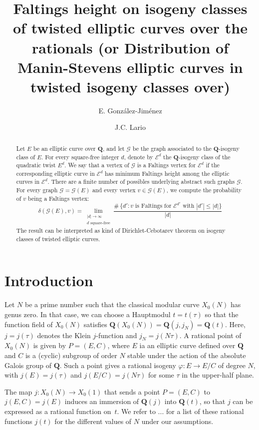 \documentclass[
  journal=small,
  manuscript=article-type,  %
  year=2020,
  volume=37,
]{cup-journal}
\title{Faltings height on isogeny classes of twisted elliptic curves over the rationals (or Distribution of Manin-Stevens elliptic curves in twisted isogeny classes over)}
\author{E. González-Jiménez}
\affiliation{UAM}
\author{J.C. Lario}
\affiliation{UPC}
\begin{document}
\begin{abstract}
Let $E$ be an elliptic curve over $\mathbf{Q}$, and let $\mathcal{G}$ be the graph associated to the $\mathbf{Q}$-isogeny class of $E$.  
For every square-free integer $d$, denote by $\mathcal{E}^d$ the $\mathbf{Q}$-isogeny class of the quadratic twist $E^d$.
We say that a vertex of $\mathcal{G}$ is a Faltings vertex for $\mathcal{E}^d$ if the corresponding elliptic curve in  $\mathcal{E}^d$ has minimum Faltings height among the elliptic curves in 
$\mathcal{E}^d$. There are a finite number of possibles underlying abstract such graphs $\mathcal{G}$. For every graph $\mathcal{G}=\mathcal{G}(E)$ and every vertex $v\in \mathcal{G}(E)$, we compute the probability of $v$ being a Faltings vertex:
$$
\delta(\mathcal{G}(E),v) = \lim_{\substack{
|d|\to \infty \\ d \text{ square-free} }}
\frac{
\# \, \{ d'\colon 
v \text{ is  Faltings for } \mathcal{E}^{d'} 
\text{ with }
|d'|
\leq  |d| \} }{|d|} 
$$
The result can be interpreted as kind of Dirichlet-Cebotarev theorem on isogeny classes of twisted elliptic curves.  
\end{abstract}



\section{Introduction} 
Let $N$ be a prime number such that the classical modular curve $X_0(N)$ has genus zero. In that case, we can choose a Hauptmodul $t=t(\tau)$  so that the function field of $X_0(N)$ satisfies $\mathbf{Q}(X_0(N))=\mathbf{Q}(j,j_N)=\mathbf{Q}(t)$. Here, $j=j(\tau)$ denotes the Klein $j$-function and $j_N=j(N\tau)$.
A rational point of $X_0(N)$ is given by $P=(E,C)$, where $E$ ia an elliptic curve defined over $\mathbf{Q}$ and $C$ is a (cyclic) subgroup of order $N$ stable under the action of the absolute Galois group of $\mathbf{Q}$. Such a point  gives a rational isogeny $\varphi\colon E \longrightarrow E/C$ of degree $N$, with $j(E)=j(\tau)$ and $j(E/C)=j(N\tau)$ for some $\tau$ in the upper-half plane.

The map $j\colon X_0(N)\longrightarrow X_0(1)$  
that sends a point $P=(E,C)$ to $j(E,C)=j(E)$ induces an immersion of $\mathbf{Q}(j)$ into $\mathbf{Q}(t)$, so that $j$ can be expressed as a rational function on~$t$. We refer to ... for a list of these rational functions $j(t)$ for the different values of $N$ under our assumptions. 
\end{document}
